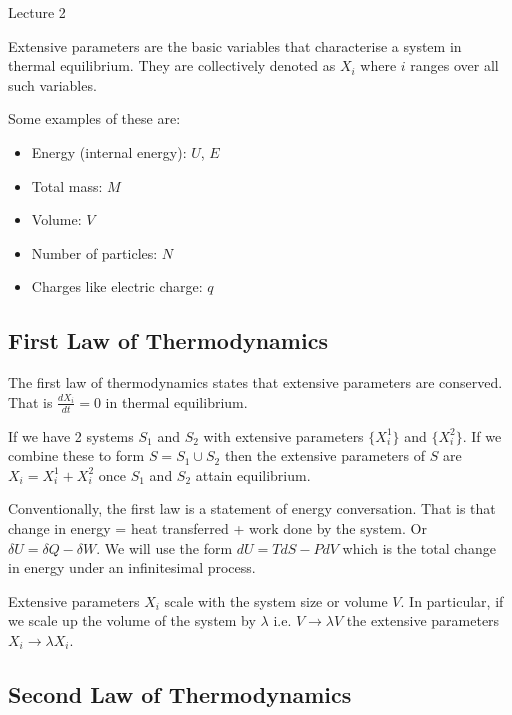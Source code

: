 \begin{center}

Lecture 2

\end{center}

Extensive parameters are the basic variables that characterise a system in thermal equilibrium. They are collectively denoted as $X_i$ where $i$ ranges over all such variables.

\vspace{\baselineskip}

Some examples of these are:

\begin{itemize}

\item Energy (internal energy): $U$, $E$
\item Total mass: $M$
\item Volume: $V$
\item Number of particles: $N$
\item Charges like electric charge: $q$

\end{itemize}

\subsection{First Law of Thermodynamics}

The first law of thermodynamics states that extensive parameters are conserved. That is $\frac{d X_i}{dt} = 0$ in thermal equilibrium.

If we have 2 systems $S_1$ and $S_2$ with extensive parameters $\{ X_i^1\}$ and $\{ X_i^2 \}$. If we combine these to form $S = S_1 \cup S_2$ then the extensive parameters of $S$ are $X_i = X_i^1 + X_i^2$ once $S_1$ and $S_2$ attain equilibrium.

Conventionally, the first law is a statement of energy conversation. That is that change in energy = heat transferred + work done by the system. Or $\delta U = \delta Q - \delta W$. We will use the form $dU = T dS - P dV$ which is the total change in energy under an infinitesimal process.

Extensive parameters $X_i$ scale with the system size or volume $V$. In particular, if we scale up the volume of the system by $\lambda$ i.e. $V \rightarrow \lambda V$ the extensive parameters $X_i \rightarrow \lambda X_i$.

\subsection{Second Law of Thermodynamics}

